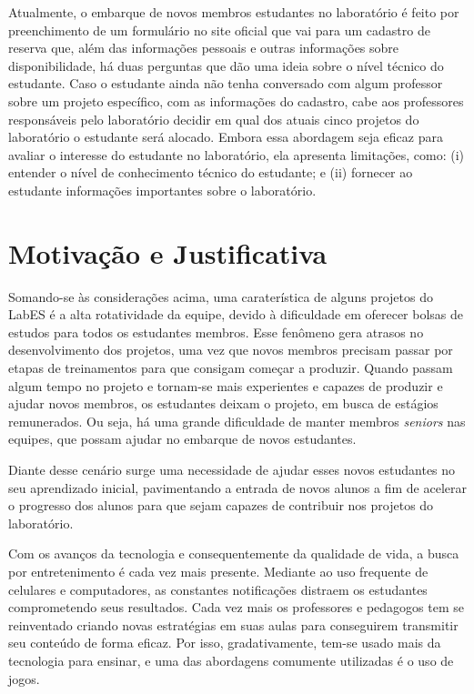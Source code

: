 Atualmente, o embarque de novos membros estudantes no laboratório é feito por preenchimento de um formulário no site oficial que vai para um cadastro de reserva que, além das informações pessoais e outras informações sobre disponibilidade, há duas perguntas que dão uma ideia sobre o nível técnico do estudante. Caso o estudante ainda não tenha conversado com algum professor sobre um projeto específico, com as informações do cadastro, cabe aos professores responsáveis pelo laboratório decidir em qual dos atuais cinco projetos do laboratório o estudante será alocado.  Embora essa abordagem seja eficaz para avaliar o interesse do estudante no laboratório, ela apresenta limitações, como: (i) entender o nível de conhecimento técnico do estudante; e (ii) fornecer ao estudante informações importantes sobre o laboratório.


\section{Motivação e Justificativa}
\label{sec-intro-motjus}
Somando-se às considerações acima, uma caraterística de alguns projetos do LabES é a alta rotatividade da equipe, devido à dificuldade em oferecer bolsas de estudos para todos os estudantes membros. Esse fenômeno gera atrasos no desenvolvimento dos projetos, uma vez que novos membros precisam passar por etapas de treinamentos para que consigam começar a produzir. Quando passam algum tempo no projeto e tornam-se mais experientes e capazes de produzir e ajudar novos membros, os estudantes deixam o projeto, em busca de estágios remunerados. Ou seja, há uma grande dificuldade de manter membros \textit{seniors} nas equipes, que possam ajudar no embarque de novos estudantes. 

Diante desse cenário surge uma necessidade de ajudar esses novos estudantes no seu aprendizado inicial, pavimentando a entrada de novos alunos a fim de acelerar o progresso dos alunos para que sejam capazes de contribuir nos projetos do laboratório.

Com os avanços da tecnologia e consequentemente da qualidade de vida, a busca por entretenimento é cada vez mais presente. Mediante ao uso frequente de celulares e computadores, as constantes notificações distraem os estudantes comprometendo seus resultados. Cada vez mais os professores e pedagogos tem se reinventado criando novas estratégias em suas aulas para conseguirem transmitir seu conteúdo de forma eficaz. Por isso, gradativamente, tem-se usado mais da tecnologia para ensinar, e uma das abordagens comumente utilizadas é o uso de jogos. 

